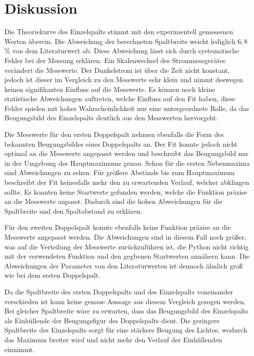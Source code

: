 \section{Diskussion}
\label{sec:Diskussion}

Die Theoriekurve des Einzelspalts stimmt mit den experimentell gemessenen Werten überein. Die Abweichung der berechneten Spaltbreite weicht lediglich
$6,8\,$\% von dem Literaturwert ab. Diese Abweichung lässt sich durch systematische Fehler bei der Messung erklären. Ein Skalenwechsel des
Strommessgerätes verändert die Messwerte. Der Dunkelstrom ist über die Zeit nicht konstant, jedoch ist dieser im Vergleich zu
den Messwerte sehr klein und nimmt deswegen keinen signifikanten Einfluss auf die Messwerte. Es können noch kleine
statistische Abweichungen auftreten, welche Einfluss auf den Fit haben, diese Fehler spielen mit hoher Wahrscheinlichkeit nur eine untergeordnete
Rolle, da das Beugungsbild des Einzelspalts deutlich aus den Messwerten hervorgeht.

Die Messwerte für den ersten Doppelspalt nehmen ebenfalls die Form des bekannten Beugungsbildes eines Doppelspalts an. Der Fit konnte jedoch nicht
optimal an die Messwerte angepasst werden und beschreibt das Beugungsbild nur in der Umgebung des Hauptmaximums genau. Schon für
die ersten Nebenmaxima sind Abweichungen zu sehen. Für größere Abstände bis zum Hauptmaximum beschreibt der Fit keinesfalls mehr den zu erwartenden Verlauf, welcher
abklingen sollte. Es konnten keine Startwerte gefunden werden, welche die Funktion präzise an die Messwerte anpasst.
Dadurch sind die hohen Abweichungen für die Spaltbreite und den Spaltabstand zu erklären.

Für den zweiten Doppelspalt konnte ebenfalls keine Funktion präzise an die Messwerte angepasst werden. Die Abweichungen sind in diesem Fall noch größer,
was auf die Verteilung der Messwerte zurückzuführen ist, die Python nicht richtig mit der verwendeten Funktion und den
gegbenen Startwerten annähern kann.
Die Abweichungen der Parameter von den Literaturwerten ist dennoch ähnlich groß wie bei dem ersten Doppelspalt.


Da die Spaltbreite des ersten Doppelspalts und des Einzelspalts voneinander verschieden ist kann keine genaue Aussage aus diesem Vergleich gezogen werden.
Bei gleicher Spaltbreite wäre zu erwarten, dass das Beugungsbild des Einzelspalts als Einhüllende der Beugungsfigur des Doppelspalts dient.
Die geringere Spaltbreite des Einzelspalts sorgt für eine stärkere Beugung des Lichtes, wodurch das Maximum breiter  wird und nicht mehr den
Verlauf der Einhüllenden einnimmt.
